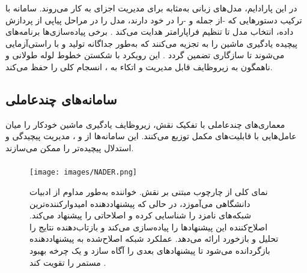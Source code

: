\subsubsection{\protect{}}
در این پارادایم، مدل‌های زبانی به‌مثابه  برای مدیریت اجزای  به کار می‌روند. سامانه با ترکیب دستور‌هایی که -از جمله  و -را در خود دارند، مدل را در مراحل پیاپی از پردازش داده، انتخاب مدل تا تنظیم فراپارامتر هدایت می‌کند \cite{zhang2023AutomlGPTAutomaticMachineLearning, shen2023HuggingGPT}. برخی پیاده‌سازی‌ها برنامه‌های پیچیده یادگیری ماشین را به  تجزیه می‌کنند که به‌طور جداگانه تولید و با  راستی‌آزمایی می‌شوند تا سازگاری تضمین گردد \cite{xu2024largeTextToML}. این رویکرد با شکستن خطوط لوله طولانی و ناهمگون به زیروظایف قابل مدیریت و اتکاء به ، انسجام کلی را حفظ می‌کند.
\subsection{سامانه‌های چندعاملی}

معماری‌های چندعاملی با تفکیک نقش، زیروظایف یادگیری ماشین خودکار را میان عامل‌هایی با قابلیت‌های مکمل توزیع می‌کنند. این سامانه‌ها از  و ، مدیریت پیچیدگی و استدلال پیچیده‌تر را ممکن می‌سازند.

\subsubsection{\protect{}}

\begin{figure}[h!]
    \centering
    \texttt{[image: images/NADER.png]}
    \caption[چارچوب مبتنی بر نقش]{
        نمای کلی از چارچوب مبتنی بر نقش. خواننده به‌طور مداوم از ادبیات دانشگاهی می‌آموزد، در حالی که پیشنهاددهنده امیدوارکننده‌ترین شبکه‌های نامزد را شناسایی کرده و اصلاحاتی را پیشنهاد می‌کند. اصلاح‌کننده این پیشنهادها را پیاده‌سازی می‌کند و بازتاب‌دهنده نتایج را تحلیل و بازخورد ارائه می‌دهد. عملکرد شبکه اصلاح‌شده به پیشنهاددهنده بازگردانده می‌شود تا پیشنهادهای بعدی را آگاه سازد و یک چرخه بهبود مستمر را تقویت کند \cite{Yang2025NADER}.
    }
    \label{fig:role-based-framework}
\end{figure}


